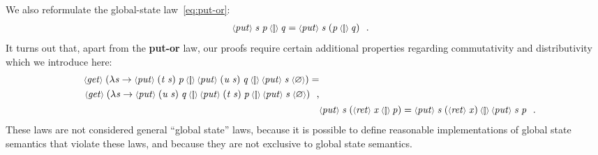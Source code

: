 \documentclass{llncs}
\newcommand{\Varid}[1]{\mathit{#1}}
\let\Varid\mathit
\begin{document}
We also reformulate the global-state law~\eqref{eq:put-or}:
\begin{align}
\ensuremath{\scaleobj{0.8}{\langle}\Varid{put}\scaleobj{0.8}{\rangle}\;\Varid{s}\;\Varid{p}\mathbin{\scaleobj{0.8}{\langle[\!]\rangle}}\Varid{q}}        &= \ensuremath{\scaleobj{0.8}{\langle}\Varid{put}\scaleobj{0.8}{\rangle}\;\Varid{s}\;(\Varid{p}\mathbin{\scaleobj{0.8}{\langle[\!]\rangle}}\Varid{q})} \mbox{~~.}\label{eq:put-or-g-d}
\end{align}
It turns out that, apart from the {\bf put-or} law,
our proofs require certain additional properties regarding commutativity and
distributivity which we introduce here:
\begin{align}
\begin{split}
\ensuremath{\scaleobj{0.8}{\langle}\Varid{get}\scaleobj{0.8}{\rangle}\;(\lambda \Varid{s}\to \scaleobj{0.8}{\langle}\Varid{put}\scaleobj{0.8}{\rangle}\;(\Varid{t}\;\Varid{s})\;\Varid{p}\mathbin{\scaleobj{0.8}{\langle[\!]\rangle}}\scaleobj{0.8}{\langle}\Varid{put}\scaleobj{0.8}{\rangle}\;(\Varid{u}\;\Varid{s})\;\Varid{q}\mathbin{\scaleobj{0.8}{\langle[\!]\rangle}}\scaleobj{0.8}{\langle}\Varid{put}\scaleobj{0.8}{\rangle}\;\Varid{s}\;\scaleobj{0.8}{\langle}\varnothing\scaleobj{0.8}{\rangle})} = \\
~~~~~~\ensuremath{\scaleobj{0.8}{\langle}\Varid{get}\scaleobj{0.8}{\rangle}\;(\lambda \Varid{s}\to \scaleobj{0.8}{\langle}\Varid{put}\scaleobj{0.8}{\rangle}\;(\Varid{u}\;\Varid{s})\;\Varid{q}\mathbin{\scaleobj{0.8}{\langle[\!]\rangle}}\scaleobj{0.8}{\langle}\Varid{put}\scaleobj{0.8}{\rangle}\;(\Varid{t}\;\Varid{s})\;\Varid{p}\mathbin{\scaleobj{0.8}{\langle[\!]\rangle}}\scaleobj{0.8}{\langle}\Varid{put}\scaleobj{0.8}{\rangle}\;\Varid{s}\;\scaleobj{0.8}{\langle}\varnothing\scaleobj{0.8}{\rangle})} \mbox {~~,}
\end{split} \label{eq:put-or-comm-g-d} \\
& \ensuremath{\scaleobj{0.8}{\langle}\Varid{put}\scaleobj{0.8}{\rangle}\;\Varid{s}\;(\scaleobj{0.8}{\langle}\Varid{ret}\scaleobj{0.8}{\rangle}\;\Varid{x}\mathbin{\scaleobj{0.8}{\langle[\!]\rangle}}\Varid{p})} = \ensuremath{\scaleobj{0.8}{\langle}\Varid{put}\scaleobj{0.8}{\rangle}\;\Varid{s}\;(\scaleobj{0.8}{\langle}\Varid{ret}\scaleobj{0.8}{\rangle}\;\Varid{x})\mathbin{\scaleobj{0.8}{\langle[\!]\rangle}}\scaleobj{0.8}{\langle}\Varid{put}\scaleobj{0.8}{\rangle}\;\Varid{s}\;\Varid{p}} \mbox{~~.}\label{eq:put-ret-or-g-d}
\end{align}
These laws are not considered general ``global state'' laws, because it is
possible to define reasonable implementations of global state semantics that
violate these laws, and because they are not exclusive to global state
semantics.
\end{document}
